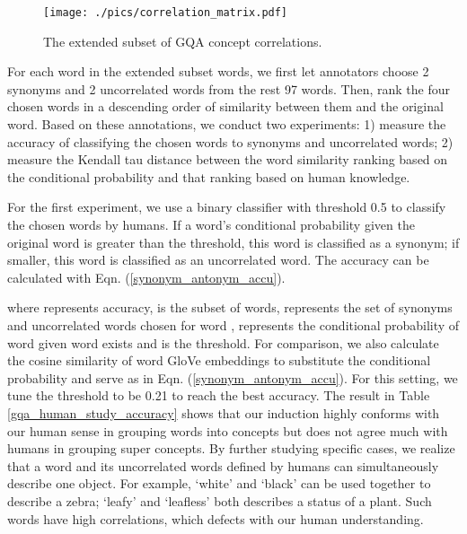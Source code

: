 \documentclass[10pt,twocolumn,letterpaper]{article}
\begin{document}
\begin{figure*}
\centering
\texttt{[image: ./pics/correlation\_matrix.pdf]}
\caption{The extended subset of GQA concept correlations.}
\label{extended_GQA_subset}
\end{figure*}

For each word in the extended subset words, we first let annotators choose 2 synonyms and 2 uncorrelated words from the rest 97 words. Then, rank the four chosen words in a descending order of similarity between them and the original word. Based on these annotations, we conduct two experiments: 1) measure the accuracy of classifying the chosen words to synonyms and uncorrelated words; 2) measure the Kendall tau distance \cite{kendall1938new} between the word similarity ranking based on the conditional probability and that ranking based on human knowledge. 

For the first experiment, we use a binary classifier with threshold 0.5 to classify the chosen words by humans. If a word's conditional probability given the original word is greater than the threshold, this word is classified as a synonym; if smaller, this word is classified as an uncorrelated word. The accuracy can be calculated with Eqn. (\ref{synonym_antonym_accu}).

where  represents accuracy,  is the subset of words,  represents the set of synonyms and uncorrelated words chosen for word ,  represents the conditional probability of word  given word  exists and  is the threshold. For comparison, we also calculate the cosine similarity of word GloVe \cite{pennington2014glove} embeddings to substitute the conditional probability and serve as  in Eqn. (\ref{synonym_antonym_accu}). For this setting, we tune the threshold  to be 0.21 to reach the best accuracy. The result in Table \ref{gqa_human_study_accuracy} shows that our induction highly conforms with our human sense in grouping words into concepts but does not agree much with humans in grouping super concepts. By further studying specific cases, we realize that a word and its uncorrelated words defined by humans can simultaneously describe one object. For example, `white' and `black' can be used together to describe a zebra; `leafy' and `leafless' both describes a status of a plant. Such words have high correlations, which defects with our human understanding.
\end{document}
